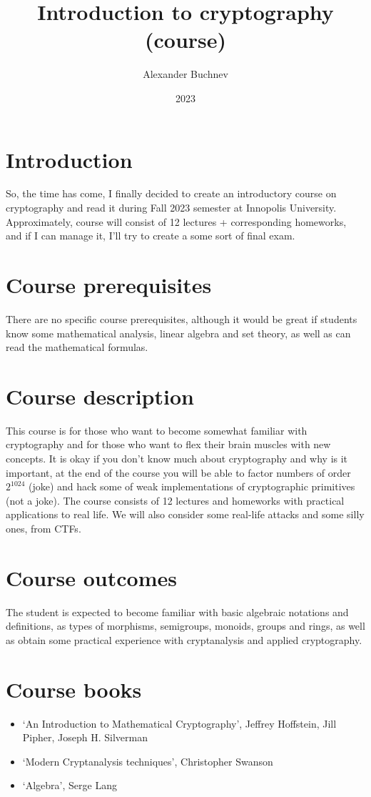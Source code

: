 \documentclass{article}
\title{Introduction to cryptography (course)}
\author{Alexander Buchnev}
\date{2023}
\begin{document}
\maketitle

\section*{Introduction}
So, the time has come, I finally decided to create an introductory course on cryptography and read it during Fall 2023 
semester at Innopolis University. Approximately, course will consist of 12 lectures + corresponding homeworks, and if I 
can manage it, I'll try to create a some sort of final exam.

\section*{Course prerequisites}
There are no specific course prerequisites, although it would be great if students know some mathematical analysis, 
linear algebra and set theory, as well as can read the mathematical formulas.

\section*{Course description}
This course is for those who want to become somewhat familiar with cryptography and for those who want to flex their 
brain muscles with new concepts. It is okay if you don't know much about cryptography and why is it important, at the 
end of the course you will be able to factor numbers of order $2^{1024}$ (joke) and hack some of weak implementations of
cryptographic primitives (not a joke). The course consists of 12 lectures and homeworks with practical applications to 
real life. We will also consider some real-life attacks and some silly ones, from CTFs. 

\section*{Course outcomes}
The student is expected to become familiar with basic algebraic notations and definitions, as types of morphisms, 
semigroups, monoids, groups and rings, as well as obtain some practical experience with cryptanalysis and applied 
cryptography. 

\section*{Course books}
\begin{itemize}
    \item `An Introduction to Mathematical Cryptography', Jeffrey Hoffstein, Jill Pipher, Joseph H. Silverman
    \item `Modern Cryptanalysis techniques', Christopher Swanson
    \item `Algebra', Serge Lang
\end{itemize}
\end{document}
